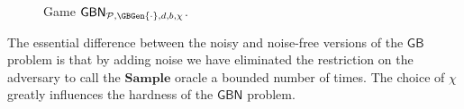 \documentclass[draft]{llncs}
\newcommand{\GB}{\ensuremath{\mathsf{GB}}\xspace}
\newcommand{\GBN}{\ensuremath{\mathsf{GBN}}\xspace}
\newcommand{\Sample}{\mathbf{Sample}}
\newcommand{\px}{\phantom{i}}
\begin{document}
\begin{definition}
\begin{figure}[ht]
{
}
\caption{Game $\GBN_{\mathcal{P},\GBGen{\cdot},d,b,\chi}$.}
\label{fig.gpn}
\vspace{-6mm} \end{figure}
\end{definition}
The essential difference between the noisy and noise-free versions of the \GB problem is that by adding noise we have eliminated the restriction on the adversary to call the $\Sample$ oracle a bounded number of times. The choice of $\chi$ greatly influences the hardness of the \GBN problem.
\end{document}
